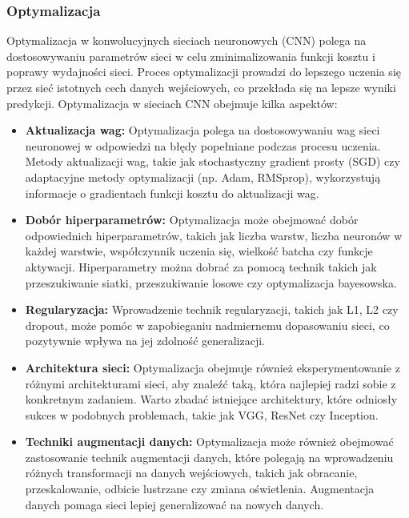 \subsubsection{Optymalizacja}
Optymalizacja w konwolucyjnych sieciach neuronowych (CNN) polega na dostosowywaniu parametrów sieci w celu zminimalizowania funkcji kosztu i poprawy wydajności sieci. Proces optymalizacji prowadzi do lepszego uczenia się przez sieć istotnych cech danych wejściowych, co przekłada się na lepsze wyniki predykcji.
Optymalizacja w sieciach CNN obejmuje kilka aspektów:
\begin{itemize}
    \item \textbf{Aktualizacja wag:} Optymalizacja polega na dostosowywaniu wag sieci neuronowej w odpowiedzi na błędy popełniane podczas procesu uczenia. Metody aktualizacji wag, takie jak stochastyczny gradient prosty (SGD) czy adaptacyjne metody optymalizacji (np. Adam, RMSprop), wykorzystują informacje o gradientach funkcji kosztu do aktualizacji wag.
    \item \textbf{Dobór hiperparametrów:} Optymalizacja może obejmować dobór odpowiednich hiperparametrów, takich jak liczba warstw, liczba neuronów w każdej warstwie, współczynnik uczenia się, wielkość batcha czy funkcje aktywacji. Hiperparametry można dobrać za pomocą technik takich jak przeszukiwanie siatki, przeszukiwanie losowe czy optymalizacja bayesowska.
    \item \textbf{Regularyzacja:} Wprowadzenie technik regularyzacji, takich jak L1, L2 czy dropout, może pomóc w zapobieganiu nadmiernemu dopasowaniu sieci, co pozytywnie wpływa na jej zdolność generalizacji.
    \item \textbf{Architektura sieci:} Optymalizacja obejmuje również eksperymentowanie z różnymi architekturami sieci, aby znaleźć taką, która najlepiej radzi sobie z konkretnym zadaniem. Warto zbadać istniejące architektury, które odniosły sukces w podobnych problemach, takie jak VGG, ResNet czy Inception.
    \item \textbf{Techniki augmentacji danych:} Optymalizacja może również obejmować zastosowanie technik augmentacji danych, które polegają na wprowadzeniu różnych transformacji na danych wejściowych, takich jak obracanie, przeskalowanie, odbicie lustrzane czy zmiana oświetlenia. Augmentacja danych pomaga sieci lepiej generalizować na nowych danych.
\end{itemize}
